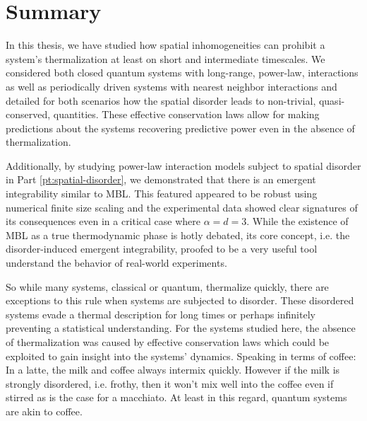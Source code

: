 \chapter*{Summary}
\label{pt:summary}
In this thesis, we have studied how spatial inhomogeneities can prohibit a system's thermalization at least on short and intermediate timescales. We considered both closed quantum systems with long-range, power-law, interactions as well as periodically driven systems with nearest neighbor interactions and detailed for both scenarios how the spatial disorder leads to non-trivial, quasi-conserved, quantities. These effective conservation laws allow for making predictions about the systems recovering predictive power even in the absence of thermalization.


Additionally, by studying power-law interaction models subject to spatial disorder in Part \ref{pt:spatial-disorder}, we demonstrated that there is an emergent integrability similar to MBL. This featured appeared to be robust using numerical finite size scaling and the experimental data showed clear signatures of its consequences even in a critical case where $\alpha=d=3$. While the existence of MBL as a true thermodynamic phase is hotly debated, its core concept, i.e. the disorder-induced emergent integrability, proofed to be a very useful tool understand the behavior of real-world experiments. 

So while many systems, classical or quantum, thermalize quickly, there are exceptions to this rule when systems are subjected to disorder. These disordered systems evade a thermal description for long times or perhaps infinitely preventing a statistical understanding. For the systems studied here, the absence of thermalization was caused by effective conservation laws which could be exploited to gain insight into the systems' dynamics.
Speaking in terms of coffee: In a latte, the milk and coffee always intermix quickly. However if the milk is strongly
disordered, i.e. frothy, then it won't mix well into the coffee even if stirred  as is the case for a macchiato. At least in this regard, quantum systems are akin to coffee.

